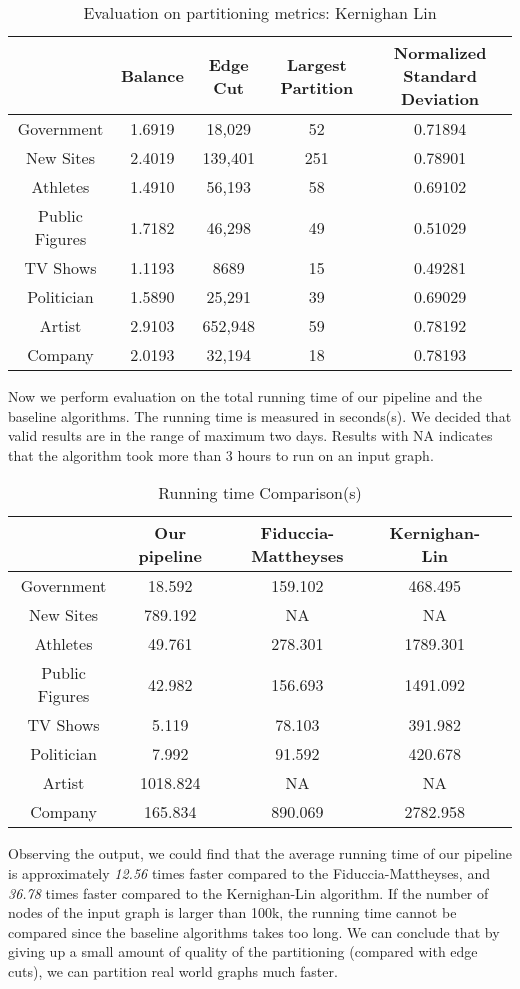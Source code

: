 \begin{table}[H]
\label{t1}
\centering
\caption{Evaluation on partitioning metrics: Kernighan Lin}
\label{t1}
\begin{tabular}{|c|c|c|c|c|}
\noalign{\smallskip}\noalign{\smallskip}\hline
& Balance & Edge Cut & Largest Partition & Normalized Standard Deviation\\
\hline
Government & 1.6919 & 18,029 & 52 & 0.71894 \\
\hline
New Sites & 2.4019 & 139,401 & 251 & 0.78901 \\
\hline
Athletes & 1.4910 & 56,193 & 58 & 0.69102 \\
\hline
Public Figures & 1.7182 & 46,298 & 49 & 0.51029\\
\hline
TV Shows & 1.1193 & 8689 & 15 & 0.49281\\
\hline
Politician & 1.5890 & 25,291 & 39 & 0.69029\\
\hline
Artist & 2.9103 & 652,948 & 59 & 0.78192\\
\hline
Company & 2.0193 & 32,194 & 18 & 0.78193\\
\hline
\end{tabular}
\end{table}
Now we perform evaluation on the total running time of our pipeline and the baseline algorithms. The running time is measured in seconds(s). We decided that valid results are in the range of maximum two days. Results with NA indicates that the algorithm took more than 3 hours to run on an input graph.
\begin{table}[H]
\label{t1}
\centering
\caption{Running time Comparison(s)}
\label{t1}
\begin{tabular}{|c|c|c|c|c|}
\noalign{\smallskip}\noalign{\smallskip}\hline
& Our pipeline & Fiduccia-Mattheyses & Kernighan-Lin \\
\hline
Government & 18.592 & 159.102 & 468.495\\
\hline
New Sites & 789.192 & NA & NA\\
\hline
Athletes & 49.761 & 278.301 & 1789.301 \\
\hline
Public Figures & 42.982 & 156.693 & 1491.092\\
\hline
TV Shows & 5.119 & 78.103 & 391.982\\
\hline
Politician & 7.992 & 91.592 & 420.678\\
\hline
Artist & 1018.824 & NA & NA\\
\hline
Company & 165.834 & 890.069 & 2782.958\\
\hline
\end{tabular}
\end{table}
Observing the output, we could find that the average running time of our pipeline is approximately \emph{12.56} times faster compared to the Fiduccia-Mattheyses, and \emph{36.78} times faster compared to the Kernighan-Lin algorithm. If the number of nodes of the input graph is larger than 100k, the running time cannot be compared since the baseline algorithms takes too long. We can conclude that by giving up a small amount of quality of the partitioning (compared with edge cuts), we can partition real world graphs much faster. 